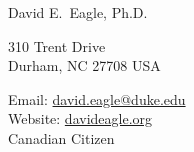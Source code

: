 \documentclass[12pt, letter]{article}
\makeatletter
\newcommand{\FirstName}{David E.}
\newcommand{\LastName}{Eagle}
\newcommand{\Degree}{Ph.D.}
\newcommand{\MyName}{\FirstName\ \LastName, \Degree}
\newcommand{\Email}{david.eagle@duke.edu}
\newcommand{\Website}{davideagle.org}
\newcommand{\Affiliation}{
	Duke Global Health Institute\\
	Duke University
	}
\newcommand{\Address}{
	    310 Trent Drive\\
	    Durham, NC 27708 USA
	}
\makeatother
\begin{document}
	
	\setlength{\LTpre}{0pt}
	\setlength{\LTpost}{2ex}
	
	\thispagestyle{empty}
	
	\begin{center}
	    {\fontsize{24pt}{0}\selectfont \MyName}
	    \\[0.3cm]
	\end{center}
	
	  \noindent
	\begin{minipage}{.6\textwidth}
	\Address\\
	\end{minipage}
	\begin{minipage}{.4\textwidth}
	\flushright
	Email: \href{mailto:\Email}{\texttt\small{\Email}}\\
	Website: {\texttt\small\href{\Website}{\Website}}\\
	Canadian Citizen
	
	\end{minipage}
	
	\vspace{-1em}
	
	
	
	
	
	
	
	
	
	
\end{document}
